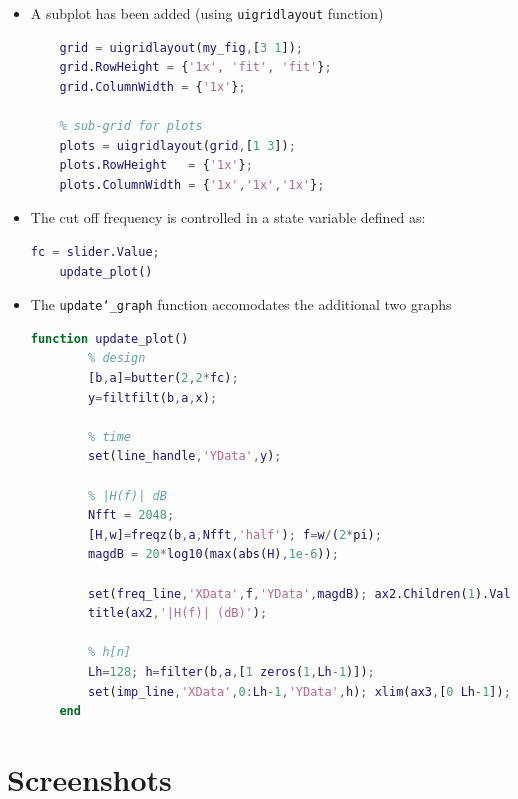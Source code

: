 \documentclass[11pt]{article}
\begin{document}
\begin{itemize}
    \item A subplot has been added (using \texttt{uigridlayout} function)
    \begin{lstlisting}[language=matlab, label={lst:code}, breaklines=true, caption={plot changes}]
    % grid layout
    grid = uigridlayout(my_fig,[3 1]); 
    grid.RowHeight = {'1x', 'fit', 'fit'}; 
    grid.ColumnWidth = {'1x'};

    % sub-grid for plots
    plots = uigridlayout(grid,[1 3]);
    plots.RowHeight   = {'1x'};
    plots.ColumnWidth = {'1x','1x','1x'};
    \end{lstlisting}
    

    \item The cut off frequency is controlled in a state variable defined as:

    \begin{lstlisting}[language=matlab, label={lst:code}, breaklines=true, caption={state variable}]
    fc = slider.Value;
    update_plot()
    \end{lstlisting}
    
    \item The \texttt{update\char`_graph} function accomodates the additional two graphs
    
    \begin{lstlisting}[language=matlab, label={lst:code}, breaklines=true, caption={state variable}]
    function update_plot()
        % design
        [b,a]=butter(2,2*fc); 
        y=filtfilt(b,a,x); 

        % time
        set(line_handle,'YData',y);

        % |H(f)| dB
        Nfft = 2048;
        [H,w]=freqz(b,a,Nfft,'half'); f=w/(2*pi);
        magdB = 20*log10(max(abs(H),1e-6));

        set(freq_line,'XData',f,'YData',magdB); ax2.Children(1).Value = fc;
        title(ax2,'|H(f)| (dB)');

        % h[n]
        Lh=128; h=filter(b,a,[1 zeros(1,Lh-1)]);
        set(imp_line,'XData',0:Lh-1,'YData',h); xlim(ax3,[0 Lh-1]); title(ax3,'Impulse response h[n]');
    end
    \end{lstlisting}   

\end{itemize}

\section*{Screenshots}
\end{document}
